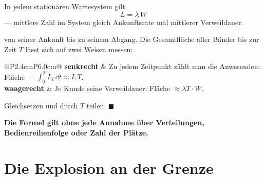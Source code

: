 \begin{merksatz}
In jedem stationären Wartesystem gilt
\[ L = \lambda\,W \]
--- mittlere Zahl im System gleich Ankunftsrate mal mittlerer Verweildauer.

 von seiner Ankunft bis zu seinem Abgang. Die Gesamtfläche aller Bänder bis zur Zeit $T$ lässt sich auf zwei Weisen messen:
\begin{center}
{\small
\renewcommand{\arraystretch}{1.5}
\begin{tabular}{@{}P{2.4cm}P{6.0cm}@{}}
\toprule
\textbf{senkrecht} & Zu jedem Zeitpunkt zählt man die Anwesenden: Fläche $= \int_0^T L_t\,\dd t \approx L\,T$.\\
\textbf{waagerecht} & Je Kunde seine Verweildauer: Fläche $\approx \lambda T \cdot W$.\\
\bottomrule
\end{tabular}}
\end{center}
Gleichsetzen und durch $T$ teilen. $\blacksquare$

\begin{center}
\begin{minipage}{0.9\textwidth}
\textbf{Die Formel gilt ohne jede Annahme über Verteilungen, Bedienreihenfolge oder Zahl der Plätze.}
\end{minipage}
\end{center}

\begin{center}
\begin{minipage}{0.88\textwidth}
\end{minipage}
\end{center}
\end{merksatz}

\section{Die Explosion an der Grenze}

